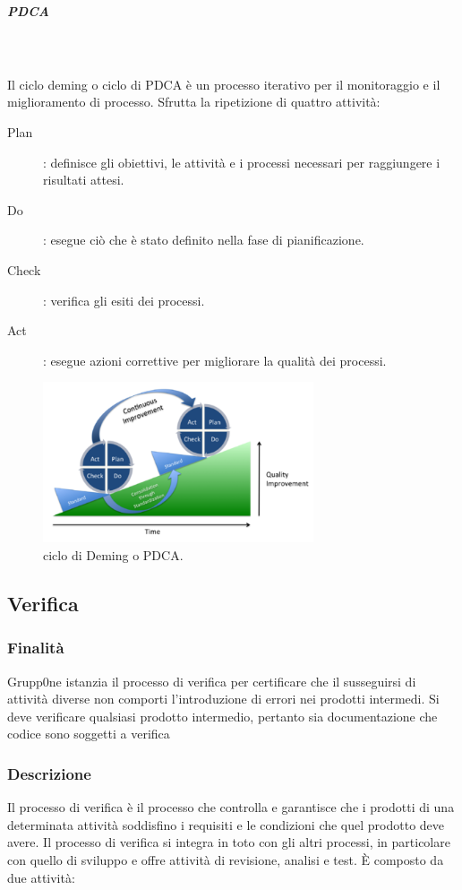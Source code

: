 \documentclass[../norme-di-progetto.tex]{subfiles}
\begin{document}
\subparagraph{PDCA}\mbox{}\\
\label{subp:PDCA}
\\Il ciclo deming o ciclo di PDCA è un processo iterativo per il monitoraggio e il miglioramento di processo. Sfrutta la ripetizione di quattro attività:
\begin{description}
  \item [Plan]: definisce gli obiettivi, le attività e i processi necessari per raggiungere i risultati attesi.
  \item [Do]: esegue ciò che è stato definito nella fase di pianificazione.
  \item [Check]: verifica gli esiti dei processi.
  \item [Act]: esegue azioni correttive per migliorare la qualità dei processi.
\end{description}
\begin{figure}[H]
  \includegraphics[width=8cm]{components/PDCA-process.png}
  \centering
  \caption{ciclo di Deming o PDCA.}
\end{figure}

\subsection{Verifica}
\label{sub:verifica}
\subsubsection{Finalità}
\label{subs:finalità}
Grupp0ne istanzia il processo di verifica  per certificare che il susseguirsi di attività diverse non comporti l'introduzione di errori nei prodotti intermedi.
Si deve verificare qualsiasi prodotto intermedio, pertanto sia documentazione che codice sono soggetti a verifica
\subsubsection{Descrizione}

Il processo di verifica è il processo che controlla e garantisce che i prodotti di una determinata attività soddisfino i requisiti e le condizioni che quel prodotto deve avere. Il processo di verifica si integra in toto con gli altri processi, in particolare con quello di sviluppo e offre attività di revisione, analisi e test. È composto da due attività:
\end{document}

